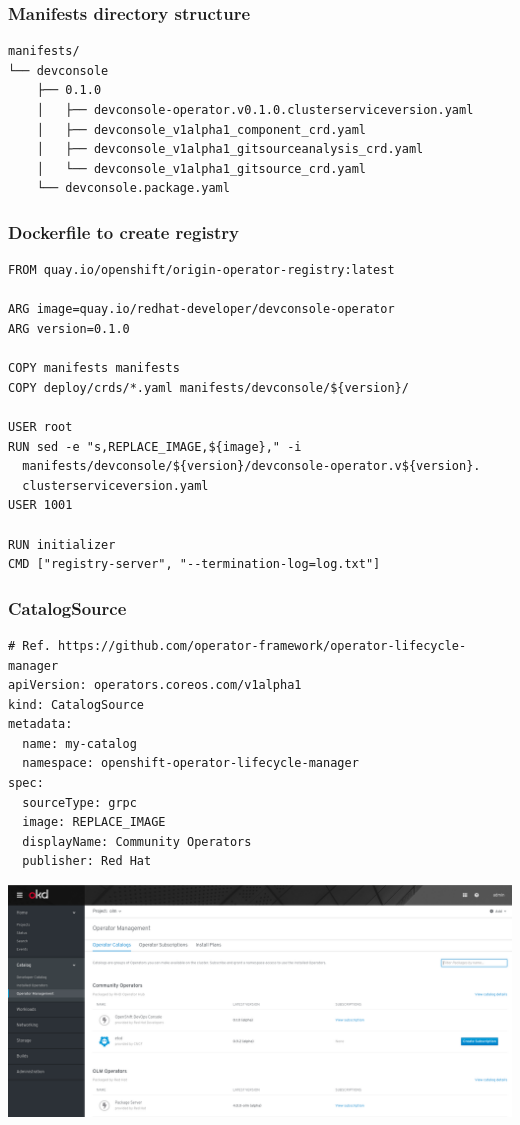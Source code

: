 \documentclass[aspectratio=169]{beamer}
\begin{document}
\begin{frame}[fragile]
  \frametitle{Manifests directory structure}

  \begin{Verbatim}[fontsize=\small]
manifests/
└── devconsole
    ├── 0.1.0
    │   ├── devconsole-operator.v0.1.0.clusterserviceversion.yaml
    │   ├── devconsole_v1alpha1_component_crd.yaml
    │   ├── devconsole_v1alpha1_gitsourceanalysis_crd.yaml
    │   └── devconsole_v1alpha1_gitsource_crd.yaml
    └── devconsole.package.yaml
  \end{Verbatim}

\end{frame}

\begin{frame}[fragile]
  \frametitle{Dockerfile to create registry}

  \begin{Verbatim}[fontsize=\small]
FROM quay.io/openshift/origin-operator-registry:latest

ARG image=quay.io/redhat-developer/devconsole-operator
ARG version=0.1.0

COPY manifests manifests
COPY deploy/crds/*.yaml manifests/devconsole/${version}/

USER root
RUN sed -e "s,REPLACE_IMAGE,${image}," -i
  manifests/devconsole/${version}/devconsole-operator.v${version}.
  clusterserviceversion.yaml
USER 1001

RUN initializer
CMD ["registry-server", "--termination-log=log.txt"]
  \end{Verbatim}

\end{frame}

\begin{frame}[fragile]
  \frametitle{CatalogSource}

  \begin{Verbatim}[fontsize=\small]
# Ref. https://github.com/operator-framework/operator-lifecycle-manager
apiVersion: operators.coreos.com/v1alpha1
kind: CatalogSource
metadata:
  name: my-catalog
  namespace: openshift-operator-lifecycle-manager
spec:
  sourceType: grpc
  image: REPLACE_IMAGE
  displayName: Community Operators
  publisher: Red Hat
  \end{Verbatim}
\end{frame}

\begin{frame}

  \includegraphics[scale=.20]{images/catsrc.png}

\end{frame}
\end{document}
